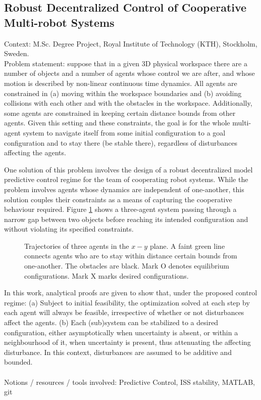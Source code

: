 \subsection{Robust Decentralized Control of Cooperative Multi-robot Systems}

Context: M.Sc. Degree Project, Royal Institute of Technology (KTH), Stockholm, Sweden.\\

Problem statement: suppose that in a given 3D physical workspace there are
a number of objects and a number of agents whose control we are after, and
whose motion is described by non-linear continuous time dynamics. All agents
are constrained in (a) moving within the workspace boundaries and (b) avoiding
collisions with each other and with the obstacles in the workspace.
Additionally, some agents are constrained in keeping certain distance bounds
from other agents. Given this setting and these constraints, the goal is for the
whole multi-agent system to navigate itself from some initial configuration to a
goal configuration and to stay there (be stable there), regardless of
disturbances affecting the agents.

One solution of this problem involves the design of a robust decentralized model
predictive control regime for the team of cooperating robot systems. While the
problem involves agents whose dynamics are independent of one-another, this solution
couples their constraints as a means of capturing the cooperative behaviour required.
Figure \ref{fig:d_OFF_res_trajectory_3_2} shows a three-agent system passing
through a narrow gap between two objects before reaching its intended
configuration and without violating its specified constraints.

\begin{figure}[H]\centering
  \scalebox{0.8}{}
  \caption{Trajectories of three agents in the $x-y$ plane. A faint green line
    connects agents who are to stay within distance certain bounds from
    one-another. The obstacles are black. Mark O denotes equilibrium
    configurations. Mark X marks desired configurations.}
  \label{fig:d_OFF_res_trajectory_3_2}
\end{figure}

In this work, analytical proofs are given to show that, under the proposed
control regime: (a) Subject to initial feasibility, the optimization solved at
each step by each agent will always be feasible, irrespective of whether or not
disturbances affect the agents. (b) Each (sub)system can be stabilized to a
desired configuration, either asymptotically when uncertainty is absent,
or within a neighbourhood of it, when uncertainty is present, thus attenuating
the affecting disturbance. In this context, disturbances are assumed to be
additive and bounded.\\\\
Notions / resources / tools involved: Predictive Control, ISS stability, MATLAB, git
